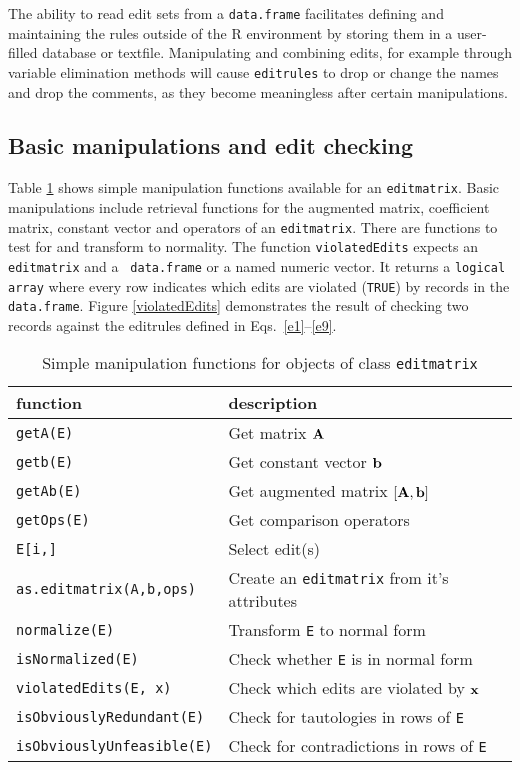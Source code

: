\documentclass[10pt, fleqn, a4paper]{article}
\begin{document}
The ability to read edit sets from a {\tt data.frame} facilitates defining and
maintaining the rules outside of the R environment by storing them in a
user-filled database or textfile. Manipulating and combining edits, for example
through variable elimination methods will cause {\tt editrules} to drop or
change the names and drop the comments, as they become meaningless after
certain manipulations.

\subsection{Basic manipulations and edit checking}
Table \ref{simplemanipulations} shows simple manipulation functions available
for an {\tt editmatrix}. Basic manipulations include retrieval functions for
the augmented matrix, coefficient matrix, constant vector and operators of an
{\tt editmatrix}. There are functions to test for and transform to normality.
The function {\tt violatedEdits} expects an {\tt editmatrix} and a {\tt
data.frame} or a named numeric vector. It returns a {\tt logical} {\tt array}
where every row indicates which edits are violated ({\tt TRUE}) by records in
the {\tt data.frame}. Figure \ref{violatedEdits} demonstrates the result of
checking two records against the editrules defined in Eqs.\ \eqref{e1}--\eqref{e9}.
%
%
\begin{table}
\begin{threeparttable}
\caption{Simple manipulation functions for objects of class {\tt editmatrix}}
\label{simplemanipulations}
\begin{tabular}{ll}
\hline
function                      & description\\
\hline
{\tt getA(E)}                 & Get matrix $\bf A$\\
{\tt getb(E)}                 & Get constant vector $\bf b$\\
{\tt getAb(E)}                & Get augmented matrix $[{\bf A},{\bf b}]$\\
{\tt getOps(E)}               & Get comparison operators\\
{\tt E[i,]}                   & Select edit(s) \\
{\tt as.editmatrix(A,b,ops)}  & Create an {\tt editmatrix} from it's attributes\\
{\tt normalize(E)}            & Transform {\tt E} to normal form\\
{\tt isNormalized(E)}         & Check whether {\tt E} is in normal form\\
{\tt violatedEdits(E, x)}     & Check which edits are violated by ${\bf x}$\\
{\tt isObviouslyRedundant(E)} & Check for tautologies in rows of {\tt E}\\
{\tt isObviouslyUnfeasible(E)}   & Check for contradictions in rows of {\tt E}\\
\hline
\end{tabular}
\end{threeparttable}
\end{table}
\end{document}
